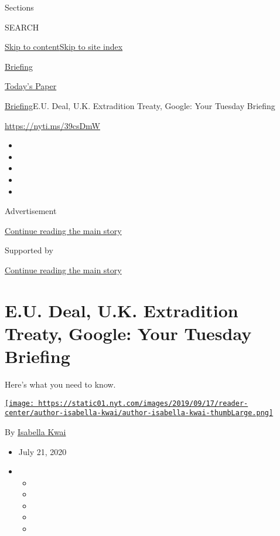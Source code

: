 Sections

SEARCH

\protect\hyperlink{site-content}{Skip to
content}\protect\hyperlink{site-index}{Skip to site index}

\href{https://www.nytimes.com/interactive/2018/briefing/global-morning-briefing-newsletter-signup.html}{Briefing}

\href{https://myaccount.nytimes.com/auth/login?response_type=cookie\&client_id=vi}{}

\href{https://www.nytimes.com/section/todayspaper}{Today's Paper}

\href{/interactive/2018/briefing/global-morning-briefing-newsletter-signup.html}{Briefing}\textbar{}E.U.
Deal, U.K. Extradition Treaty, Google: Your Tuesday Briefing

\url{https://nyti.ms/39csDmW}

\begin{itemize}
\item
\item
\item
\item
\item
\end{itemize}

Advertisement

\protect\hyperlink{after-top}{Continue reading the main story}

Supported by

\protect\hyperlink{after-sponsor}{Continue reading the main story}

\hypertarget{eu-deal-uk-extradition-treaty-google-your-tuesday-briefing}{%
\section{E.U. Deal, U.K. Extradition Treaty, Google: Your Tuesday
Briefing}\label{eu-deal-uk-extradition-treaty-google-your-tuesday-briefing}}

Here's what you need to know.

\href{https://www.nytimes.com/by/isabella-kwai}{\texttt{[image: https://static01.nyt.com/images/2019/09/17/reader-center/author-isabella-kwai/author-isabella-kwai-thumbLarge.png]}}

By \href{https://www.nytimes.com/by/isabella-kwai}{Isabella Kwai}

\begin{itemize}
\item
  July 21, 2020
\item
  \begin{itemize}
  \item
  \item
  \item
  \item
  \item
  \end{itemize}
\end{itemize}

